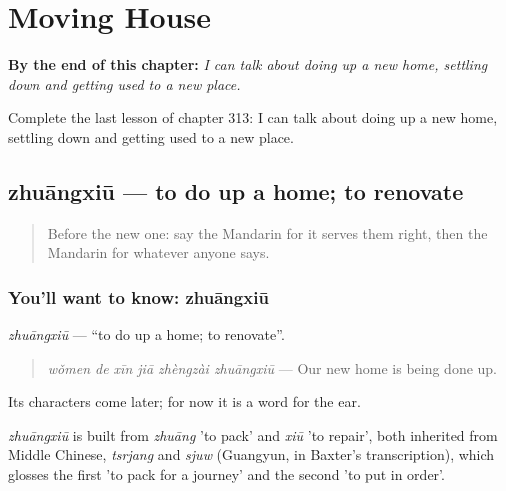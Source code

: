
\chapter{Moving House}
\label{ch:zh-moving-house}

\begin{chapteropening}
\textbf{By the end of this chapter:} \emph{I can talk about doing up a new home, settling down and getting used to a new place.}

Complete the last lesson of chapter 313: I can talk about doing up a new home, settling down and getting used to a new place.
\end{chapteropening}

\section[zhuāngxiū]{zhuāngxiū — to do up a home; to renovate}

\label{lesson:ZH-C313-zhuangxiu}



\begin{quote}
Before the new one: say the Mandarin for it serves them right, then the Mandarin for whatever anyone says.
\end{quote}

\subsection*{You'll want to know: zhuāngxiū}
\emph{zhuāngxiū} — \textquotedblleft{}to do up a home; to renovate\textquotedblright{}.

\begin{quote}
\emph{wǒmen de xīn jiā zhèngzài zhuāngxiū} — Our new home is being done up.
\end{quote}

Its characters come later; for now it is a word for the ear.

\begin{cousinweb}
\emph{zhuāngxiū} is built from \emph{zhuāng} 'to pack' and \emph{xiū} 'to repair', both inherited from Middle Chinese, \emph{tsrjang} and \emph{sjuw} (Guangyun, in Baxter's transcription), which glosses the first 'to pack for a journey' and the second 'to put in order'.
\end{cousinweb}

